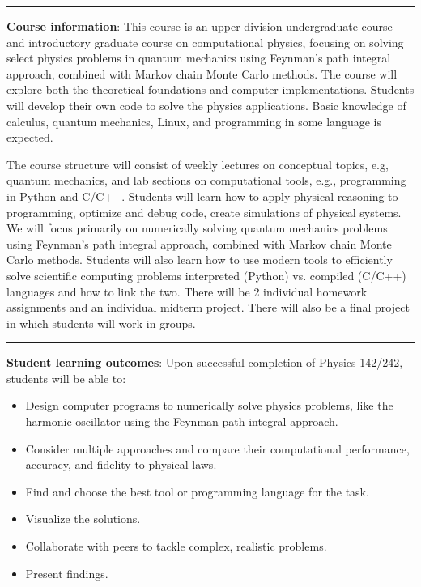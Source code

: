 \documentclass[12pt]{article}
\begin{document}
\begin{center}
  \rule{\textwidth}{0.5pt}
\end{center}

\noindent\textbf{Course information}: This course is an upper-division undergraduate course and introductory graduate course on computational physics, focusing on solving select physics problems in quantum mechanics using Feynman's path integral approach, combined with Markov chain Monte Carlo methods.
The course will explore both the theoretical foundations and computer implementations.
Students will develop their own code to solve the physics applications.
Basic knowledge of calculus, quantum mechanics, Linux, and programming in some language is expected.

The course structure will consist of weekly lectures on conceptual topics, e.g, quantum mechanics, and lab sections on computational tools, e.g., programming in Python and C/C++.
Students will learn how to apply physical reasoning to programming, optimize and debug code, create simulations of physical systems.
We will focus primarily on numerically solving quantum mechanics problems using Feynman's path integral approach, combined with Markov chain Monte Carlo methods.
Students will also learn how to use modern tools to efficiently solve scientific computing problems interpreted (Python) vs. compiled (C/C++) languages and how to link the two.
There will be 2 individual homework assignments and an individual midterm project.
There will also be a final project in which students will work in groups.

\begin{center}
  \rule{\textwidth}{0.5pt}
\end{center}

\noindent\textbf{Student learning outcomes}: Upon successful completion of Physics 142/242, students will be able to:
\begin{itemize}
  \itemsep-0.3em
  \item Design computer programs to numerically solve physics problems, like the harmonic oscillator using the Feynman path integral approach.
  \item Consider multiple approaches and compare their computational performance, accuracy, and fidelity to physical laws.
  \item Find and choose the best tool or programming language for the task.
  \item Visualize the solutions.
  \item Collaborate with peers to tackle complex, realistic problems.
  \item Present findings.
\end{itemize}
\end{document}
